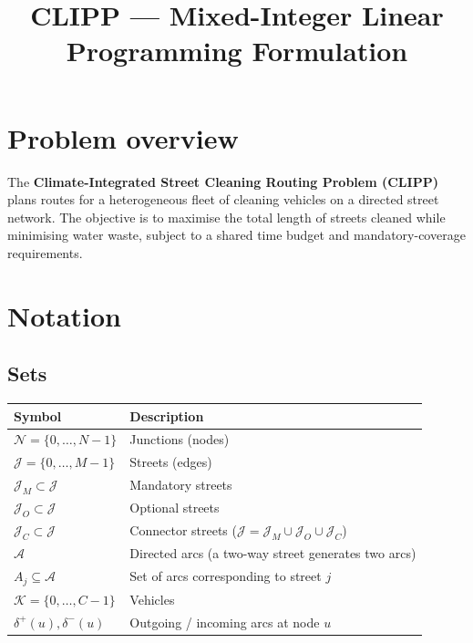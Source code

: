 \documentclass[11pt]{article}
\title{CLIPP --- Mixed-Integer Linear Programming Formulation}
\author{}
\date{}
\newcommand{\setN}{\mathcal{N}}   %
\newcommand{\setA}{\mathcal{A}}   %
\newcommand{\setJ}{\mathcal{J}}   %
\newcommand{\setK}{\mathcal{K}}   %
\newcommand{\Jm}{\mathcal{J}_M}   %
\newcommand{\Jo}{\mathcal{J}_O}   %
\newcommand{\Jc}{\mathcal{J}_C}   %
\newcommand{\Aj}{A_j}             %
\begin{document}
\maketitle

\section{Problem overview}

The \textbf{Climate-Integrated Street Cleaning Routing Problem (CLIPP)}
plans routes for a heterogeneous fleet of cleaning vehicles on a directed
street network.  The objective is to maximise the total length of streets
cleaned while minimising water waste, subject to a shared time budget and
mandatory-coverage requirements.

\section{Notation}

\subsection{Sets}

\begin{table}[h]
\centering
\begin{tabular}{@{} l l @{}}
\toprule
Symbol & Description \\
\midrule
$\setN = \{0, \dots, N-1\}$       & Junctions (nodes) \\
$\setJ = \{0, \dots, M-1\}$       & Streets (edges) \\
$\Jm \subset \setJ$               & Mandatory streets \\
$\Jo \subset \setJ$               & Optional streets \\
$\Jc \subset \setJ$               & Connector streets ($\setJ = \Jm \cup \Jo \cup \Jc$) \\
$\setA$                            & Directed arcs (a two-way street generates two arcs) \\
$\Aj \subseteq \setA$             & Set of arcs corresponding to street $j$ \\
$\setK = \{0, \dots, C-1\}$       & Vehicles \\
$\delta^+(u), \delta^-(u)$         & Outgoing / incoming arcs at node $u$ \\
\bottomrule
\end{tabular}
\end{table}
\end{document}
